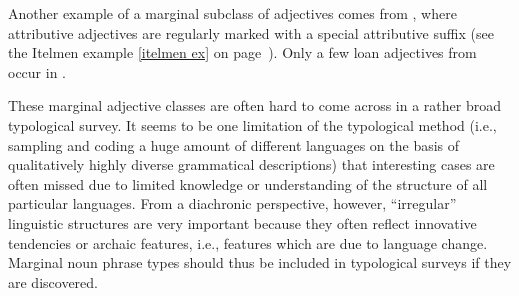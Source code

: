Another example of a marginal subclass of adjectives comes from , where attributive adjectives are regularly marked with a special attributive suffix (see the Itelmen example \ref{itelmen ex} on page~\pageref{itelmen synchr}). Only a few loan adjectives from  occur in  \citep[60–71]{volodin1997}.

These marginal adjective classes are often hard to come across in a rather broad typological survey. It seems to be one limitation of the typological method (i.e., sampling and coding a huge amount of different languages on the basis of qualitatively highly diverse grammatical descriptions) that interesting cases are often missed due to limited knowledge or understanding of the structure of all particular languages. From a diachronic perspective, however, “irregular” linguistic structures are very important because they often reflect innovative tendencies or archaic features, i.e., features which are due to language change. Marginal noun phrase types should thus be included in typological surveys if they are discovered.

